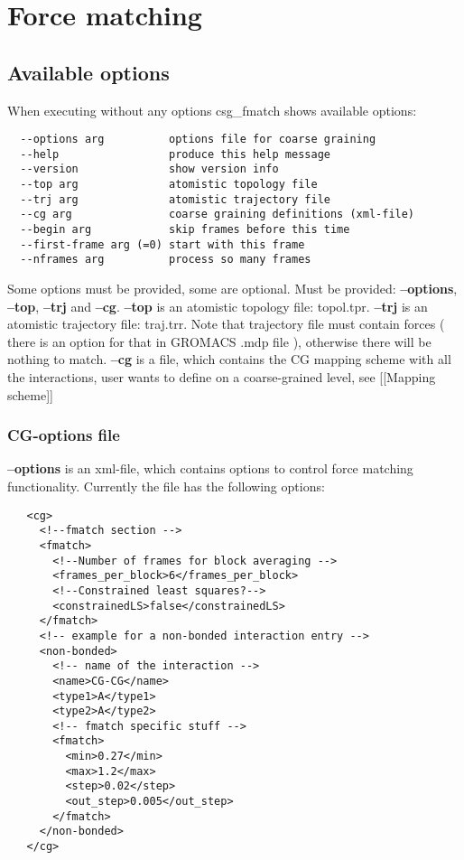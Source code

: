 \section{Force matching}
\sasha

\subsection{Available options}
When executing without any options csg\_fmatch shows available options:
\begin{verbatim}
  --options arg          options file for coarse graining
  --help                 produce this help message
  --version              show version info
  --top arg              atomistic topology file
  --trj arg              atomistic trajectory file
  --cg arg               coarse graining definitions (xml-file)
  --begin arg            skip frames before this time
  --first-frame arg (=0) start with this frame
  --nframes arg          process so many frames
\end{verbatim}
Some options must be provided, some are optional. Must be provided: \textbf{--options}, \textbf{--top}, \textbf{--trj} and \textbf{--cg}. \textbf{--top} is an atomistic topology file: topol.tpr. \textbf{--trj} is an atomistic trajectory file: traj.trr. Note that trajectory file must contain forces ( there is an option for that in GROMACS .mdp file ), otherwise there will be nothing to match. \textbf{--cg} is a file, which contains the CG mapping scheme with all the interactions, user wants to define on a coarse-grained level, see [[Mapping scheme]]

\subsubsection{CG-options file}
\textbf{--options} is an xml-file, which contains options to control force matching functionality. 
Currently the file has the following options:
\begin{verbatim}
   <cg>
     <!--fmatch section -->
     <fmatch>
       <!--Number of frames for block averaging -->
       <frames_per_block>6</frames_per_block>
       <!--Constrained least squares?-->
       <constrainedLS>false</constrainedLS>
     </fmatch>
     <!-- example for a non-bonded interaction entry -->
     <non-bonded>
       <!-- name of the interaction -->
       <name>CG-CG</name>
       <type1>A</type1>
       <type2>A</type2>
       <!-- fmatch specific stuff -->
       <fmatch>
         <min>0.27</min>
         <max>1.2</max>
         <step>0.02</step>
         <out_step>0.005</out_step>
       </fmatch>
     </non-bonded>
   </cg>
\end{verbatim}

